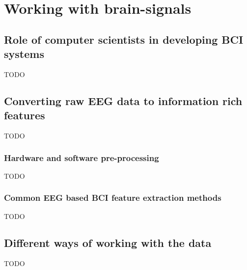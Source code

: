 
\glsresetall

\chapter{Working with brain-signals}
\label{ch:processing_signals}


\section{Role of computer scientists in developing BCI systems}
\label{sec:processing_signals_why_cs}
TODO


\section{Converting raw EEG data to information rich features}
\label{sec:processing_signals_useful_data}
TODO



\subsection{Hardware and software pre-processing}
\label{subsec:processing_signals_useful_data_preproc}
TODO



\subsection{Common EEG based BCI feature extraction methods}
\label{subsec:processing_signals_useful_data_feature}

TODO



\section{Different ways of working with the data}
\label{sec:processing_signals_interpreting}
TODO

